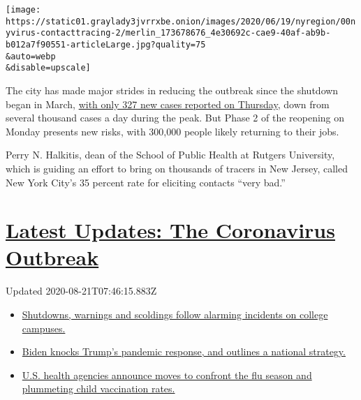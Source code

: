 \texttt{[image: https://static01.graylady3jvrrxbe.onion/images/2020/06/19/nyregion/00nyvirus-contacttracing-2/merlin\_173678676\_4e30692c-cae9-40af-ab9b-b012a7f90551-articleLarge.jpg?quality=75\\\&auto=webp\\\&disable=upscale]}

The city has made major strides in reducing the outbreak since the
shutdown began in March,
\href{https://www.nytimes3xbfgragh.onion/interactive/2020/nyregion/new-york-city-coronavirus-cases.html\#cases}{with
only 327 new cases reported on Thursday}, down from several thousand
cases a day during the peak. But Phase 2 of the reopening on Monday
presents new risks, with 300,000 people likely returning to their jobs.

Perry N. Halkitis, dean of the School of Public Health at Rutgers
University, which is guiding an effort to bring on thousands of tracers
in New Jersey, called New York City's 35 percent rate for eliciting
contacts ``very bad.''

\hypertarget{latest-updates-the-coronavirus-outbreak}{%
\section{\texorpdfstring{\href{https://www.nytimes3xbfgragh.onion/2020/08/20/world/coronavirus-covid.html?action=click\&pgtype=Article\&state=default\&region=MAIN_CONTENT_1\&context=storylines_live_updates}{Latest
Updates: The Coronavirus
Outbreak}}{Latest Updates: The Coronavirus Outbreak}}\label{latest-updates-the-coronavirus-outbreak}}

Updated 2020-08-21T07:46:15.883Z

\begin{itemize}
\tightlist
\item
  \href{https://www.nytimes3xbfgragh.onion/2020/08/20/world/coronavirus-covid.html?action=click\&pgtype=Article\&state=default\&region=MAIN_CONTENT_1\&context=storylines_live_updates\#link-68774d88}{Shutdowns,
  warnings and scoldings follow alarming incidents on college campuses.}
\item
  \href{https://www.nytimes3xbfgragh.onion/2020/08/20/world/coronavirus-covid.html?action=click\&pgtype=Article\&state=default\&region=MAIN_CONTENT_1\&context=storylines_live_updates\#link-26b58724}{Biden
  knocks Trump's pandemic response, and outlines a national strategy.}
\item
  \href{https://www.nytimes3xbfgragh.onion/2020/08/20/world/coronavirus-covid.html?action=click\&pgtype=Article\&state=default\&region=MAIN_CONTENT_1\&context=storylines_live_updates\#link-4e542da3}{U.S.
  health agencies announce moves to confront the flu season and
  plummeting child vaccination rates.}
\end{itemize}

